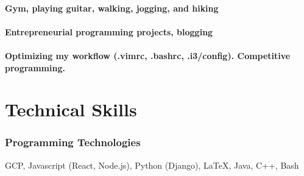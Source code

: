 \documentclass{article}
\begin{document}
\paragraph{Gym, playing guitar, walking, jogging, and hiking}

\paragraph{Entrepreneurial programming projects, blogging}

\paragraph{Optimizing my workflow (.vimrc, .bashrc, .i3/config). Competitive
  programming.}


\section{Technical Skills}

\subsubsection{Programming Technologies}
\hfill GCP, Javascript (React, Node.js), Python (Django), \LaTeX, Java, C++, Bash

\end{document}
